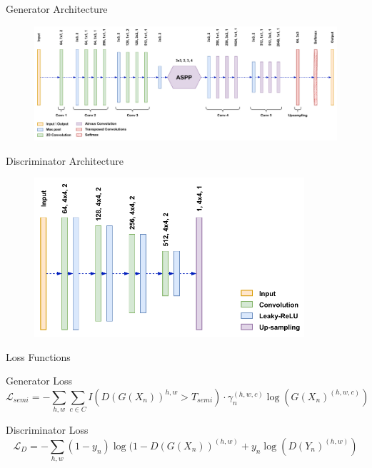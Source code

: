 \begin{frame}{Generator Architecture}
    \begin{figure}[!htb]
        \centering
        \includegraphics[width=14cm]{figures/method/generator_architecture}
    \end{figure}
\end{frame}


\begin{frame}{Discriminator Architecture}
    \begin{figure}[!htb]
        \centering
        \includegraphics[width=10cm]{figures/method/discriminator_architecture}
    \end{figure}
\end{frame}


\begin{frame}{Loss Functions}
    \begin{block}{Generator Loss}
        \begin{equation}
            \mathcal{L}_{semi} = -\sum_{h, w} \sum_{c \in{} C} I(D(G(X_n))^{h, w} > T_{semi})\cdot \gamma_{n}^{(h, w, c)} \log(G(X_n)^{(h, w, c)})
        \end{equation}
    \end{block}
    \begin{block}{Discriminator Loss}
        \begin{equation}
            \mathcal{L}_{D} = -\sum_{h, w}(1-y_n) \log(1-D(G(X_n))^{(h, w)} + y_n \log(D(Y_n)^{(h, w)})
        \end{equation}
    \end{block}
\end{frame}

